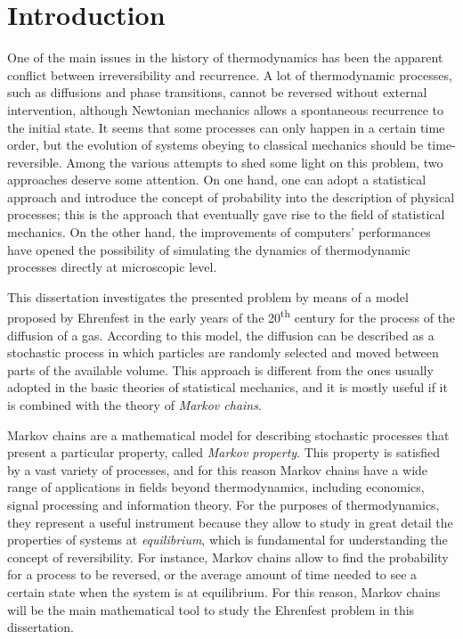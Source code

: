 \chapter{Introduction}
One of the main issues in the history of thermodynamics has been the apparent conflict between irreversibility and recurrence. A lot of thermodynamic processes, such as diffusions and phase transitions, cannot be reversed without external intervention, although Newtonian mechanics allows a spontaneous recurrence to the initial state. It seems that some processes can only happen in a certain time order, but the evolution of systems obeying to classical mechanics should be time-reversible. Among the various attempts to shed some light on this problem, two approaches deserve some attention. On one hand, one can adopt a statistical approach and introduce the concept of probability into the description of physical processes; this is the approach that eventually gave rise to the field of statistical mechanics. On the other hand, the improvements of computers' performances have opened the possibility of simulating the dynamics of thermodynamic processes directly at microscopic level.

This dissertation investigates the presented problem by means of a model proposed by Ehrenfest in the early years of the 20\textsuperscript{th} century for the process of the diffusion of a gas. According to this model, the diffusion can be described as a stochastic process in which particles are randomly selected and moved between parts of the available volume. This approach is different from the ones usually adopted in the basic theories of statistical mechanics, and it is mostly useful if it is combined with the theory of \emph{Markov chains}.

Markov chains are a mathematical model for describing stochastic processes that present a particular property, called \emph{Markov property}. This property is satisfied by a vast variety of processes, and for this reason Markov chains have a wide range of applications in fields beyond thermodynamics, including economics, signal processing and information theory. For the purposes of thermodynamics, they represent a useful instrument because they allow to study in great detail the properties of systems at \emph{equilibrium}, which is fundamental for understanding the concept of reversibility. For instance, Markov chains allow to find the probability for a process to be reversed, or the average amount of time needed to see a certain state when the system is at equilibrium. For this reason, Markov chains will be the main mathematical tool to study the Ehrenfest problem in this dissertation.

